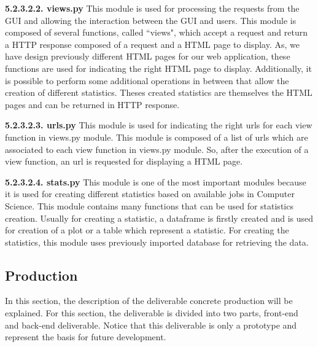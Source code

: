 \documentclass[conference,compsoc]{IEEEtran}
\begin{document}
\noindent
\newline\newline
\textbf{5.2.3.2.2. views.py}
\newline\newline
This module is used for processing the requests from the GUI and allowing the interaction between the GUI and users. 
\newline
This module is composed of several functions, called ``views", which accept a request and return a HTTP response composed of a request and a HTML page to display. As, we have design previously different HTML pages for our web application, these functions are used for indicating the right HTML page to display. 
Additionally, it is possible to perform some additional operations in between that allow the creation of different statistics. Theses created statistics are themselves the HTML pages and can be returned in HTTP response. 

\noindent
\newline\newline
\textbf{5.2.3.2.3. urls.py}
\newline\newline
This module is used for indicating the right urls for each view function in views.py module. This module is composed of a list of urls which are associated to each view function in views.py module. So, after the execution of a view function, an url is requested for displaying a HTML page. 

\noindent
\newline\newline
\textbf{5.2.3.2.4. stats.py}
\newline\newline
This module is one of the most important modules because it is used for creating different statistics based on available jobs in Computer Science. This module contains many functions that can be used for statistics creation. 
\newline
Usually for creating a statistic, a dataframe is firstly created and is used for creation of a plot or a table which represent a statistic. For creating the statistics, this module uses previously imported database for retrieving the data.   

\subsection{Production}
In this section, the description of the deliverable concrete production will be explained. For this section, the deliverable is divided into two parts, front-end and back-end deliverable. Notice that this deliverable is only a prototype and represent the basis for future development.
                                 
\end{document}
